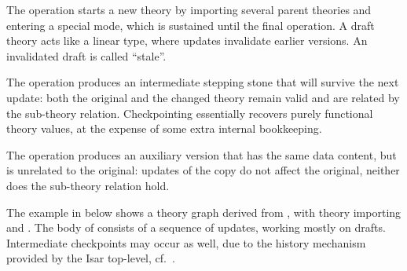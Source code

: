 \begin{isabellebody}
\begin{isamarkuptext}
  The  operation starts a new theory by importing
  several parent theories and entering a special  mode,
  which is sustained until the final  operation.  A draft
  theory acts like a linear type, where updates invalidate earlier
  versions.  An invalidated draft is called ``stale''.

  The  operation produces an intermediate stepping
  stone that will survive the next update: both the original and the
  changed theory remain valid and are related by the sub-theory
  relation.  Checkpointing essentially recovers purely functional
  theory values, at the expense of some extra internal bookkeeping.

  The  operation produces an auxiliary version that has
  the same data content, but is unrelated to the original: updates of
  the copy do not affect the original, neither does the sub-theory
  relation hold.

  \medskip The example in  below shows a theory
  graph derived from , with theory 
  importing  and .  The body of  consists of a sequence of updates, working mostly on
  drafts.  Intermediate checkpoints may occur as well, due to the
  history mechanism provided by the Isar top-level, cf.\
  .


\end{isamarkuptext}
\end{isabellebody}
